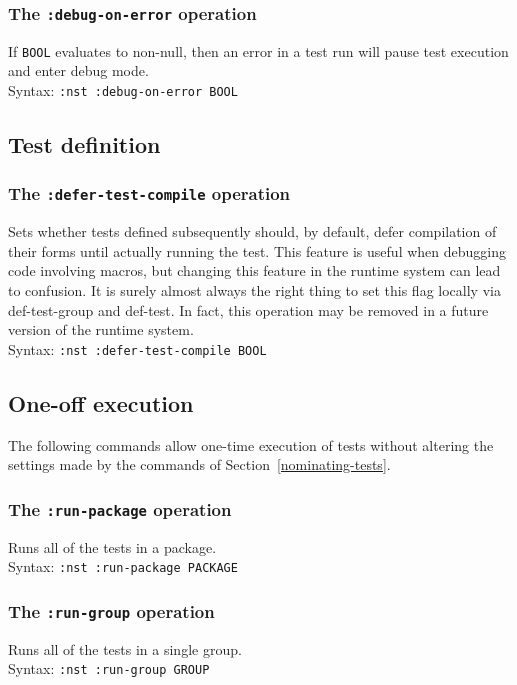 \documentclass{article}
\begin{document}
\subsubsection{The \texttt{:debug-on-error} operation}
%
If \texttt{BOOL} evaluates to non-null, then an error in a test run
will pause test execution and enter debug mode.
\\ Syntax: \texttt{:nst :debug-on-error BOOL}

\subsection{Test definition}
\subsubsection{The \texttt{:defer-test-compile} operation}
%
Sets whether tests defined subsequently should, by default, defer
compilation of their forms until actually running the test.  This
feature is useful when debugging code involving macros, but changing
this feature in the runtime system can lead to confusion.  It is
surely almost always the right thing to set this flag locally via
def-test-group and def-test.  In fact, this operation may be removed
in a future version of the runtime system.
\\ Syntax: \texttt{:nst :defer-test-compile BOOL}

\subsection{One-off execution}
The following commands allow one-time execution of tests without
altering the settings made by the commands of
Section~\ref{nominating-tests}.

\subsubsection{The \texttt{:run-package} operation}
%
Runs all of the tests in a package.
\\ Syntax: \texttt{:nst :run-package PACKAGE}

\subsubsection{The \texttt{:run-group} operation}
%
Runs all of the tests in a single group.
\\ Syntax: \texttt{:nst :run-group GROUP}
\end{document}
